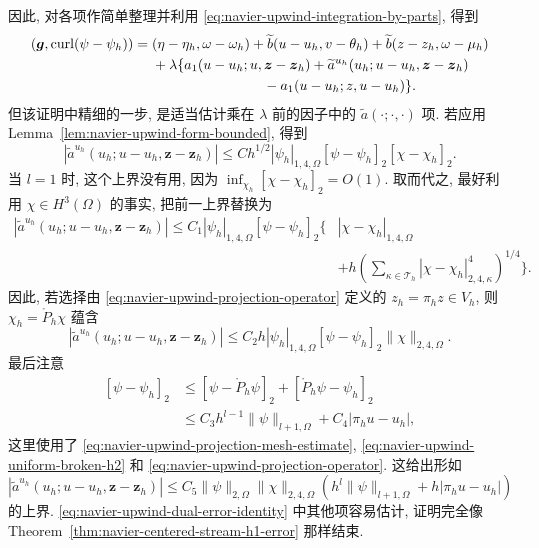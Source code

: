 \begin{Proof}
因此, 对各项作简单整理并利用 \eqref{eq:navier-upwind-integration-by-parts}, 得到
\begin{equation}\label{eq:navier-upwind-dual-error-identity}
\begin{aligned}
(\boldsymbol g,\operatorname{curl}(\psi-\psi_h))
={}&(\eta-\eta_h,\omega-\omega_h)
+\widetilde b(u-u_h,v-\theta_h)
+\widetilde b(z-z_h,\omega-\mu_h)\\
&+\lambda\{a_1(u-u_h;u,\boldsymbol z-\boldsymbol z_h)
+\widetilde a^{u_h}(u_h;u-u_h,\boldsymbol z-\boldsymbol z_h)\\
&\hspace{28mm}-a_1(u-u_h;z,u-u_h)\}.
\end{aligned}
\end{equation}
但该证明中精细的一步, 是适当估计乘在 $\lambda$ 前的因子中的
$\widetilde a(\mathord\cdot;\mathord\cdot,\mathord\cdot)$ 项. 若应用
Lemma~\ref{lem:navier-upwind-form-bounded}, 得到
\[
|\widetilde a^{u_h}(u_h;u-u_h,\boldsymbol z-\boldsymbol z_h)|
\leq Ch^{1/2}|\psi_h|_{1,4,\Omega}
[\psi-\psi_h]_2[\chi-\chi_h]_2.
\]
当 $l=1$ 时, 这个上界没有用, 因为
$\inf_{\chi_h}[\chi-\chi_h]_2=O(1)$. 取而代之, 最好利用
$\chi\in H^3(\Omega)$ 的事实, 把前一上界替换为
\[
\begin{aligned}
|\widetilde a^{u_h}(u_h;u-u_h,\boldsymbol z-\boldsymbol z_h)|
\leq C_1|\psi_h|_{1,4,\Omega}[\psi-\psi_h]_2
\Bigg\{&|\chi-\chi_h|_{1,4,\Omega}\\
&+h\left(\sum_{\kappa\in\mathcal T_h}
|\chi-\chi_h|_{2,4,\kappa}^4\right)^{1/4}\Bigg\}.
\end{aligned}
\]
因此, 若选择由 \eqref{eq:navier-upwind-projection-operator} 定义的
$z_h=\pi_hz\in V_h$, 则 $\chi_h=\mathring P_h\chi$ 蕴含
\[
|\widetilde a^{u_h}(u_h;u-u_h,\boldsymbol z-\boldsymbol z_h)|
\leq C_2h|\psi_h|_{1,4,\Omega}[\psi-\psi_h]_2
\|\chi\|_{2,4,\Omega}.
\]
最后注意
\begin{equation}\label{eq:navier-upwind-stream-mesh-error}
\begin{aligned}
[\psi-\psi_h]_2
&\leq[\psi-\mathring P_h\psi]_2
+[\mathring P_h\psi-\psi_h]_2\\
&\leq C_3h^{l-1}\|\psi\|_{l+1,\Omega}
+C_4|\pi_hu-u_h|,
\end{aligned}
\end{equation}
这里使用了 \eqref{eq:navier-upwind-projection-mesh-estimate},
\eqref{eq:navier-upwind-uniform-broken-h2} 和
\eqref{eq:navier-upwind-projection-operator}. 这给出形如
\[
|\widetilde a^{u_h}(u_h;u-u_h,\boldsymbol z-\boldsymbol z_h)|
\leq C_5\|\psi\|_{2,\Omega}\|\chi\|_{2,4,\Omega}
(h^l\|\psi\|_{l+1,\Omega}+h|\pi_hu-u_h|)
\]
的上界. \eqref{eq:navier-upwind-dual-error-identity} 中其他项容易估计,
证明完全像 Theorem~\ref{thm:navier-centered-stream-h1-error} 那样结束.
\end{Proof}

